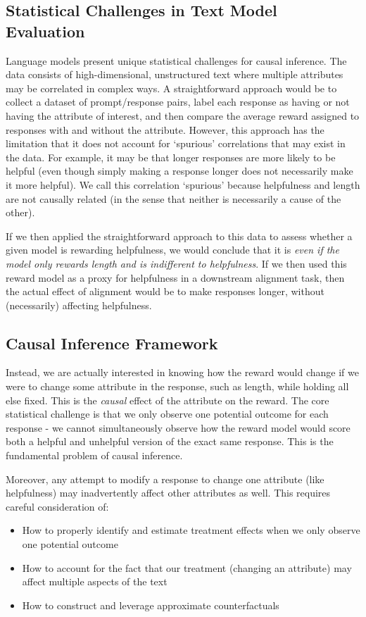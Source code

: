 \documentclass{article}
\theoremstyle{definition}
\begin{document}
\subsection{Statistical Challenges in Text Model Evaluation}
Language models present unique statistical challenges for causal inference. The data consists of high-dimensional, unstructured text where multiple attributes may be correlated in complex ways. A straightforward approach would be to collect a dataset of prompt/response pairs, label each response as having or not having the attribute of interest, and then compare the average reward assigned to responses with and without the attribute. However, this approach has the limitation that it does not account for `spurious' correlations that may exist in the data. For example, it may be that longer responses are more likely to be helpful (even though simply making a response longer does not necessarily make it more helpful). We call this correlation `spurious' because helpfulness and length are not causally related (in the sense that neither is necessarily a cause of the other).

If we then applied the straightforward approach to this data to assess whether a given model is rewarding helpfulness, we would conclude that it is \emph{even if the model only rewards length and is indifferent to helpfulness}. If we then used this reward model as a proxy for helpfulness in a downstream alignment task, then the actual effect of alignment would be to make responses longer, without (necessarily) affecting helpfulness.

\subsection{Causal Inference Framework}
Instead, we are actually interested in knowing how the reward would change if we were to change some attribute in the response, such as length, while holding all else fixed. This is the \emph{causal} effect of the attribute on the reward. The core statistical challenge is that we only observe one potential outcome for each response - we cannot simultaneously observe how the reward model would score both a helpful and unhelpful version of the exact same response. This is the fundamental problem of causal inference.

Moreover, any attempt to modify a response to change one attribute (like helpfulness) may inadvertently affect other attributes as well. This requires careful consideration of:
\begin{itemize}
\item How to properly identify and estimate treatment effects when we only observe one potential outcome
\item How to account for the fact that our treatment (changing an attribute) may affect multiple aspects of the text
\item How to construct and leverage approximate counterfactuals
\end{itemize}
\end{document}
